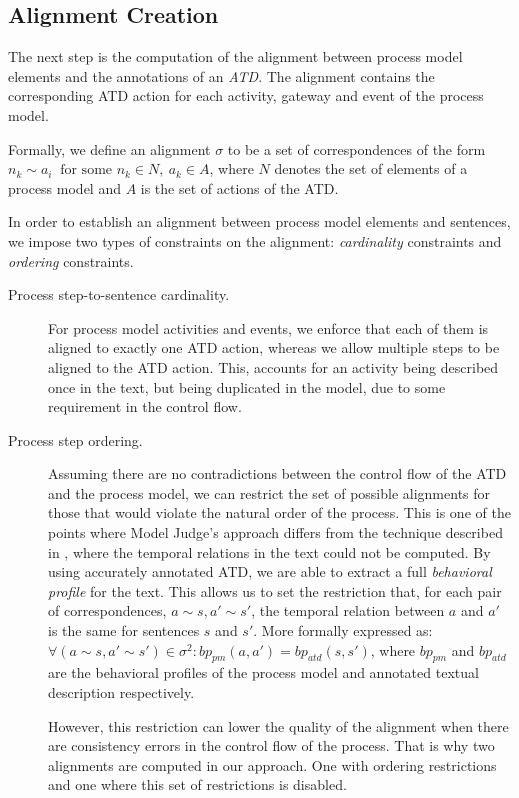 \subsection{Alignment Creation}
\label{sec:alignment_creation}

The next step is the computation of the alignment between process model elements
and the annotations of an \emph{ATD}. The alignment contains the
corresponding ATD action for each activity, gateway and event of the process model.

\newcommand{\corresp}[2]{#1 \sim #2}
\newcommand{\ncorresp}[2]{#1 \nsim #2}

Formally, we define an alignment $\sigma$ to be a set of correspondences of the
form $\corresp{n_k}{a_i} ~ \text{ for some } n_k \in N, ~ a_k \in A$, where $N$
denotes the set of elements of a process model and  $A$ is the set of actions
of the ATD. 

In order to establish an alignment between process model elements and sentences,
we impose two types of constraints on the alignment:  \textit{cardinality}
constraints and \textit{ordering} constraints.

\begin{description}
\item[Process step-to-sentence cardinality.]{
    For process model activities and events, we enforce that each of them is
    aligned to exactly one ATD action, whereas we allow multiple steps to be aligned
    to the ATD action. This, accounts for an activity being described once in
    the text, but being duplicated in the model, due to some requirement in the
    control flow.}
\item[Process step ordering.]{Assuming there are no contradictions between the
    control flow of the ATD and the process model, we can restrict the set of
    possible alignments for those that would violate the natural order of the
    process. This is one of the points where Model Judge's approach
    differs from the technique described in \cite[Section
    5.6]{10.1007/978-3-319-59536-8_26}, where the temporal relations in the text
    could not be computed. By using accurately annotated ATD, we are able to
    extract a full \emph{behavioral profile} for the text. This allows us to set
    the restriction that, for each pair of correspondences, $a \sim s, a' \sim
    s'$, the temporal relation between $a$ and $a'$ is the same for sentences
    $s$ and $s'$. More formally expressed as: $\forall (a \sim s, a' \sim s')
    \in \sigma^2 : bp_{pm}(a, a') = bp_{atd}(s, s')$, where $bp_{pm}$ and
    $bp_{atd}$ are the behavioral profiles of the process model and annotated
    textual description respectively.
    
    However, this restriction can lower the quality of the alignment when there
    are consistency errors in the control flow of the process. That is why two
    alignments are computed in our approach. One with ordering restrictions and
    one where this set of restrictions is disabled.}
\end{description}


